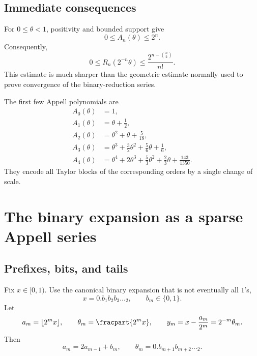 \documentclass[11pt,oneside]{article}
\theoremstyle{definition}
\theoremstyle{remark}
\begin{document}
\subsection{Immediate consequences}

For $0\le\theta<1$, positivity and bounded support give
\begin{equation}\label{dyadicq:eq:Appell-bound}
  0\le A_n(\theta)\le 2^n.
\end{equation}
Consequently,
\begin{equation}\label{dyadicq:eq:R-superbound}
  0\le R_n(2^{-n}\theta)
  \le \frac{2^{n-\binom n2}}{n!}.
\end{equation}
This estimate is much sharper than the geometric estimate normally used to
prove convergence of the binary-reduction series.

The first few Appell polynomials are
\begin{align*}
 A_0(\theta)&=1,\\
 A_1(\theta)&=\theta+\frac12,\\
 A_2(\theta)&=\theta^2+\theta+\frac5{18},\\
 A_3(\theta)&=\theta^3+\frac32\theta^2+\frac56\theta+\frac16,\\
 A_4(\theta)&=\theta^4+2\theta^3+\frac53\theta^2
              +\frac23\theta+\frac{143}{1350}.
\end{align*}
They encode all Taylor blocks of the corresponding orders by a single change
of scale.

\section{The binary expansion as a sparse Appell series}

\subsection{Prefixes, bits, and tails}

Fix $x\in[0,1)$.  Use the canonical binary expansion that is not eventually
all $1$'s,
\begin{equation}\label{dyadicq:eq:binary-x}
  x=0.b_1b_2b_3\ldots{}_2,
  \qquad b_m\in\{0,1\}.
\end{equation}
Let
\begin{equation}\label{dyadicq:eq:prefix-tail}
  a_m=\lfloor2^m x\rfloor,
  \qquad
  \theta_m=\fracpart{2^m x},
  \qquad
  y_m=x-\frac{a_m}{2^m}=2^{-m}\theta_m.
\end{equation}
Then
\begin{equation}\label{dyadicq:eq:bit-prefix-relation}
  a_m=2a_{m-1}+b_m,
  \qquad
  \theta_m=0.b_{m+1}b_{m+2}\ldots{}_2.
\end{equation}
\end{document}
